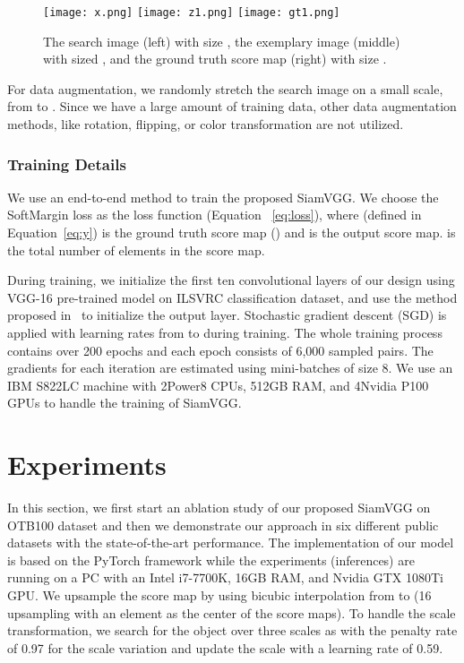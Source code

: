 \documentclass[runningheads]{llncs}
\begin{document}
\begin{figure}
\centering
\texttt{[image: x.png]}\hfill
\texttt{[image: z1.png]}\hfill
\texttt{[image: gt1.png]}
\caption{The search image (left) with size  , the exemplary image (middle) with sized , and the ground truth score map (right) with size .}
\label{fig:xzgt_example}
\end{figure}


For data augmentation, we randomly stretch the search image on a small scale, from  to . Since we have a large amount of training data, other data augmentation methods, like rotation, flipping, or color transformation are not utilized.

\subsubsection{Training Details}

We use an end-to-end method to train the proposed SiamVGG. We choose the SoftMargin loss as the loss function (Equation ~\ref{eq:loss}), where  (defined in Equation~\ref{eq:y}) is the ground truth score map () and  is the output score map.  is the total number of elements in the score map.




During training, we initialize the first ten convolutional layers of our design using VGG-16 pre-trained model on ILSVRC classification dataset, and use the method proposed in~\cite{he2015delving} to initialize the output layer. Stochastic gradient descent (SGD) is applied with learning rates from  to  during training. The whole training process contains over 200 epochs and each epoch consists of 6,000 sampled pairs. The gradients for each iteration are estimated using mini-batches of size 8. We use an IBM S822LC machine with 2Power8 CPUs, 512GB RAM, and 4Nvidia P100 GPUs to handle the training of SiamVGG.

\section{Experiments}
\label{sec:Experiments}


In this section, we first start an ablation study of our proposed SiamVGG on OTB100 dataset and then we demonstrate our approach in six different public datasets with the state-of-the-art performance. The implementation of our model is based on the PyTorch framework while the experiments (inferences) are running on a PC with an Intel i7-7700K, 16GB RAM, and Nvidia GTX 1080Ti GPU. 
We upsample the score map by using bicubic interpolation from  to  (16 upsampling with an element as the center of the score maps). To handle the scale transformation, we search for the object over three scales as  with the penalty rate of 0.97 for the scale variation and update the scale with a learning rate of 0.59.
\end{document}
